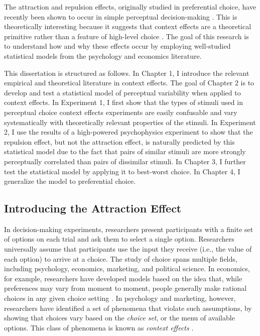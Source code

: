 \documentclass{umassthesis}          %
\begin{document}
The attraction and repulsion effects, originally studied in preferential choice, have recently been shown to occur in simple perceptual decision-making \parencite{trueblood2013not,spektorWhenGoodLooks2018b}. This is theoretically interesting because it suggests that context effects are a theoretical primitive rather than a feature of high-level choice \parencite{trueblood2013not}. The goal of this research is to understand how and why these effects occur by employing well-studied statistical models from the psychology and economics literature. 

This dissertation is structured as follows. In Chapter 1, I introduce the relevant empirical and theoretical literature in context effects. The goal of Chapter 2 is to develop and test a statistical model of perceptual variability when applied to context effects. In Experiment 1, I first show that the types of stimuli used in perceptual choice context effects experiments are easily confusable and vary systematically with theoretically relevant properties of the stimuli. In Experiment 2, I use the results of a high-powered psychophysics experiment to show that the repulsion effect, but not the attraction effect, is naturally predicted by this statistical model due to the fact that pairs of similar stimuli are more strongly perceptually correlated than pairs of dissimilar stimuli. In Chapter 3, I further test the statistical model by applying it to best-worst choice. In Chapter 4, I generalize the model to preferential choice. 

\subsection{Introducing the Attraction Effect}

In decision-making experiments, researchers present participants with a finite set of options on each trial and ask them to select a single option. Researchers universally assume that participants use the input they receive (i.e., the value of each option) to arrive at a choice. The study of choice spans multiple fields, including psychology, economics, marketing, and political science. In economics, for example, researchers have developed models based on the idea that, while preferences may vary from moment to moment, people generally make rational choices in any given choice setting \parencite{mcfadden2001economic}. In psychology and marketing, however, researchers have identified a set of phenomena that violate such assumptions, by showing that choices vary based on the \textit{choice set}, or the menu of available options. This class of phenomena is known as \textit{context effects} \parencite{adler2024forty}.
\end{document}
